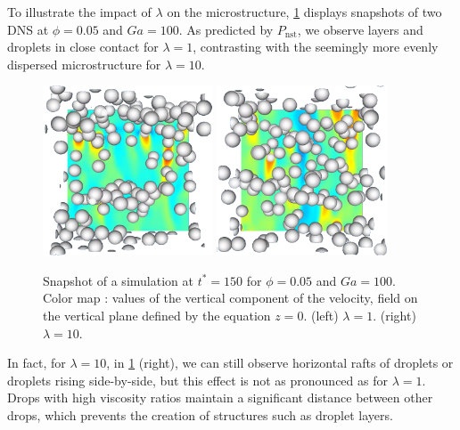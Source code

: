 To illustrate the impact of $\lambda$ on the microstructure, \ref{fig:images} displays snapshots of two DNS at $\phi = 0.05$ and $Ga = 100$. 
As predicted by $P_\text{nst}$, we observe layers and droplets in close contact for $\lambda = 1$, contrasting with the seemingly more evenly dispersed microstructure for $\lambda = 10$.
\begin{figure}[h!]
   \centering
   \includegraphics[width=0.45\textwidth]{image/HOMOGENEOUS_NEW/P_PHI_5_l_10_Ga_100.png}
   \includegraphics[width=0.45\textwidth]{image/HOMOGENEOUS_NEW/P_PHI_5_l_1_Ga_100.png}
   \caption{Snapshot of a simulation at $t^* = 150$ for $\phi=0.05$ and $Ga=100$.
   Color map : values of the vertical component of the velocity, field on the vertical plane defined by the equation $z=0$. 
   (left)  $\lambda = 1$.
   (right)  $\lambda = 10$.
   }
   \label{fig:images}
\end{figure}
In fact, for $\lambda = 10$, in \ref{fig:images} (right), we can still observe horizontal rafts of droplets or droplets rising side-by-side, but this effect is not as pronounced as for $\lambda = 1$. 
Drops with high viscosity ratios maintain a significant distance between other drops, which prevents the creation of structures such as droplet layers.
